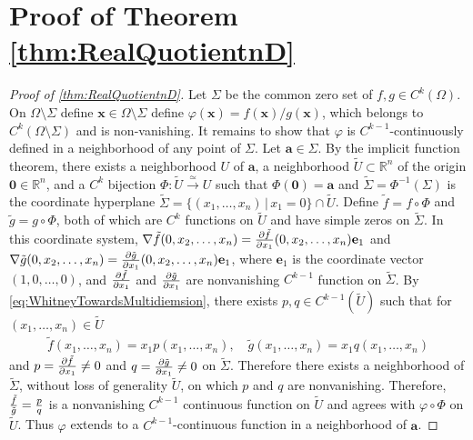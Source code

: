 \documentclass{article}
\theoremstyle{theorem}
\theoremstyle{definition}
\def\RR{\mathbb{R}}
\def\ba{\mathbf{a}}
\def\be{\mathbf{e}}
\def\bx{\mathbf{x}}
\def\bzero{\mathbf{0}}
\begin{document}
\section{Proof of Theorem \ref{thm:RealQuotientnD}}
\label{app:ProofOfRealQuotientnD}
\begin{proof}[Proof of \autoref{thm:RealQuotientnD}]
    Let \(\Sigma\) be the common zero set of \(f,g\in C^k(\Omega)\).  On \(\Omega\setminus\Sigma\) define \(\bx\in\Omega\setminus\Sigma\) define \(\varphi(\bx) = f(\bx)/g(\bx)\), which belongs to \(C^{k}(\Omega\setminus\Sigma)\) and is non-vanishing.
    It remains to show that \(\varphi\) is \(C^{k-1}\)-continuously defined in a neighborhood of any point of \(\Sigma\).  Let \(\ba\in\Sigma\).  By the implicit function theorem, there exists a neighborhood \(U\) of \(\ba\), a neighborhood \(\tilde U\subset\RR^n\) of the origin \(\bzero\in\RR^n\), and a \(C^k\) bijection \(\Phi\colon \tilde U\xrightarrow{\simeq} U\) such that \(\Phi(\bzero) = \ba\) and \(\tilde\Sigma = \Phi^{-1}(\Sigma)\) is the coordinate hyperplane \(\tilde\Sigma = \{(x_1,\ldots, x_n)\,|\,x_1 = 0\}\cap\tilde U\).
    Define \(\tilde f = f\circ\Phi\) and \(\tilde g = g\circ\Phi\), both of which are \(C^k\) functions on \(\tilde U\) and have simple zeros on \(\tilde\Sigma\).  
    In this coordinate system, \(\nabla \tilde f(0,x_2,\ldots,x_n) = {\partial \tilde f\over\partial x_1}(0,x_2,\ldots,x_n)\be_1\) and \(\nabla \tilde g(0,x_2,\ldots,x_n) = {\partial \tilde g\over\partial x_1}(0,x_2,\ldots,x_n)\be_1\), where \(\be_1\) is the coordinate vector \((1,0,\ldots,0)\), and \({\partial\tilde f\over\partial x_1}\) and \({\partial\tilde g\over\partial x_1}\) are nonvanishing \(C^{k-1}\) function on \(\tilde\Sigma\).
    By \eqref{eq:WhitneyTowardsMultidiemsion}, there exists \(p,q\in C^{k-1}(\tilde U)\) such that for \((x_1,\ldots,x_n)\in \tilde U\)
    \begin{align*}
        \tilde f(x_1,\ldots,x_n) = x_1 p(x_1,\ldots,x_n),\quad\tilde g(x_1,\ldots,x_n) = x_1q(x_1,\ldots,x_n)
    \end{align*}
    and \(p = {\partial\tilde f\over\partial x_1}\neq 0\) and \(q = {\partial\tilde g\over\partial x_1}\neq 0\) on \(\tilde\Sigma\).
    Therefore there exists a neighborhood of \(\tilde\Sigma\), without loss of generality \(\tilde U\), on which \(p\) and \(q\) are nonvanishing.  Therefore, \({\tilde f\over\tilde g} = {p\over q}\) is a nonvanishing \(C^{k-1}\) continuous function on \(\tilde U\) and agrees with \(\varphi\circ \Phi\) on \(\tilde U\).  Thus \(\varphi\) extends to a \(C^{k-1}\)-continuous function in a neighborhood of \(\ba\).
\end{proof}
\end{document}
